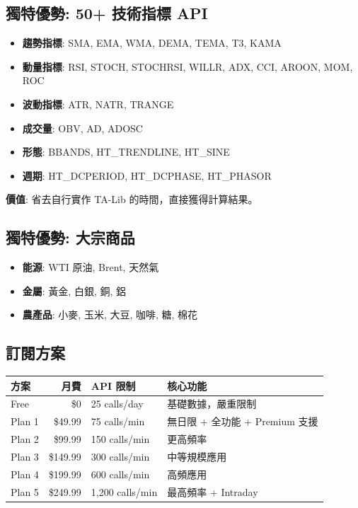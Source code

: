 \documentclass[11pt,a4paper]{article}
\begin{document}
\subsection{獨特優勢: 50+ 技術指標 API}

\begin{tcolorbox}[colback=avblue!5,colframe=avblue,title={直接 API 返回 (無需自行計算)}]
\begin{itemize}[leftmargin=*]
    \item \textbf{趨勢指標}: SMA, EMA, WMA, DEMA, TEMA, T3, KAMA
    \item \textbf{動量指標}: RSI, STOCH, STOCHRSI, WILLR, ADX, CCI, AROON, MOM, ROC
    \item \textbf{波動指標}: ATR, NATR, TRANGE
    \item \textbf{成交量}: OBV, AD, ADOSC
    \item \textbf{形態}: BBANDS, HT\_TRENDLINE, HT\_SINE
    \item \textbf{週期}: HT\_DCPERIOD, HT\_DCPHASE, HT\_PHASOR
\end{itemize}
\end{tcolorbox}

\textbf{價值}: 省去自行實作 TA-Lib 的時間，直接獲得計算結果。

\subsection{獨特優勢: 大宗商品}

\begin{tcolorbox}[colback=avblue!5,colframe=avblue,title={Commodities API (其他少有)}]
\begin{itemize}[leftmargin=*]
    \item \textbf{能源}: WTI 原油, Brent, 天然氣
    \item \textbf{金屬}: 黃金, 白銀, 銅, 鋁
    \item \textbf{農產品}: 小麥, 玉米, 大豆, 咖啡, 糖, 棉花
\end{itemize}
\end{tcolorbox}

\subsection{訂閱方案}

\begin{table}[H]
\centering
\begin{tabular}{@{}lrll@{}}
\toprule
\textbf{方案} & \textbf{月費} & \textbf{API 限制} & \textbf{核心功能} \\
\midrule
Free & \$0 & 25 calls/day & 基礎數據，嚴重限制 \\
Plan 1 & \$49.99 & 75 calls/min & 無日限 + 全功能 + Premium 支援 \\
Plan 2 & \$99.99 & 150 calls/min & 更高頻率 \\
Plan 3 & \$149.99 & 300 calls/min & 中等規模應用 \\
Plan 4 & \$199.99 & 600 calls/min & 高頻應用 \\
Plan 5 & \$249.99 & 1,200 calls/min & 最高頻率 + Intraday \\
\bottomrule
\end{tabular}
\end{table}
\end{document}
